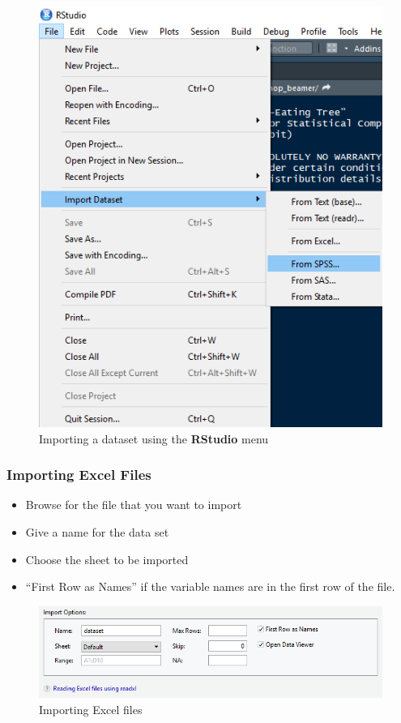 \documentclass[]{book}
\providecommand{\tightlist}{%
  \setlength{\itemsep}{0pt}\setlength{\parskip}{0pt}}
\begin{document}
\begin{figure}
\centering
\includegraphics{figure/img8.png}
\caption{Importing a dataset using the \textbf{RStudio} menu}
\end{figure}

\hypertarget{importing-excel-files}{%
\subsubsection{Importing Excel Files}\label{importing-excel-files}}

\begin{itemize}
\tightlist
\item
  Browse for the file that you want to import
\item
  Give a name for the data set
\item
  Choose the sheet to be imported
\item
  ``First Row as Names'' if the variable names are in the first row of the file.
\end{itemize}

\begin{figure}
\centering
\includegraphics{figure/img9.png}
\caption{Importing Excel files}
\end{figure}
\end{document}

